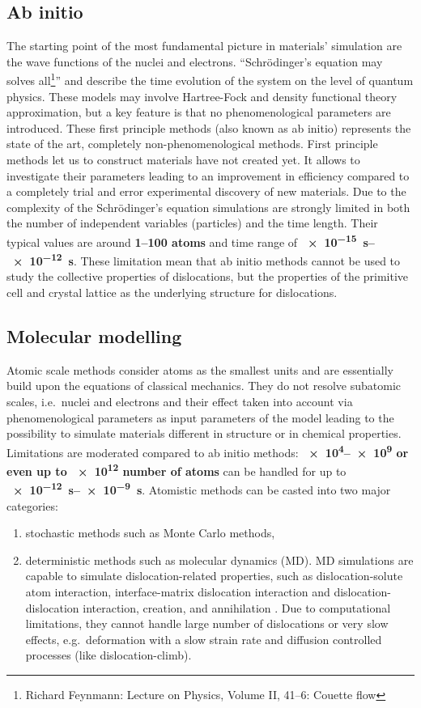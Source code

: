 \subsection{Ab initio}
The starting point of the most fundamental picture in materials' simulation are the wave functions of the nuclei and electrons. ``Schrödinger's equation may solves all\footnote{Richard Feynmann: Lecture on Physics, Volume II, 41–6: Couette flow}'' and describe the time evolution of the system on the level of quantum physics. These models may involve Hartree-Fock and density functional theory approximation, but a key feature is that no phenomenological parameters are introduced. These first principle methods (also known as ab initio) represents the state of the art, completely non-phenomenological methods. First principle methods let us to construct materials have not created yet. It allows to investigate their parameters leading to an improvement in efficiency compared to a completely trial and error experimental discovery of new materials. Due to the complexity of the Schrödinger's equation simulations are strongly limited in both the number of independent variables (particles) and the time length. Their typical values are around \textbf{\numrange{1}{100} atoms} and time range of \textbf{\SIrange{e-15}{e-12}{\second}}. These limitation mean that ab initio methods cannot be used to study the collective properties of dislocations, but the properties of the primitive cell and crystal lattice as the underlying structure for dislocations.

\subsection{Molecular modelling} \label{sec:disloc_sim_md_sim}
Atomic scale methods consider atoms as the smallest units and are essentially build upon the equations of classical mechanics. They do not resolve subatomic scales, i.e.\ nuclei and electrons and their effect taken into account via phenomenological parameters as input parameters of the model leading to the possibility to simulate materials different in structure or in chemical properties. Limitations are moderated compared to ab initio methods: \textbf{\numrange{e4}{e9} or even up to \num{e12} number of atoms} can be handled for up to \textbf{\SIrange{e-12}{e-9}{\second}}. Atomistic methods can be casted into two major categories:
\begin{enumerate}
\item stochastic methods such as Monte Carlo methods\cite{alfonso2015simulation,saito1997monte},
\item deterministic methods such as molecular dynamics (MD). MD simulations are capable to simulate dislocation-related properties, such as dislocation-solute atom interaction, interface-matrix dislocation interaction and dislocation-dislocation interaction, creation, and annihilation \cite{ZHANG2013132,doi:10.1080/14786430903081990,Yamakov2002}. Due to computational limitations, they cannot handle large number of dislocations or very slow effects, e.g.\ deformation with a slow strain rate and diffusion controlled processes (like dislocation-climb).
\end{enumerate}


